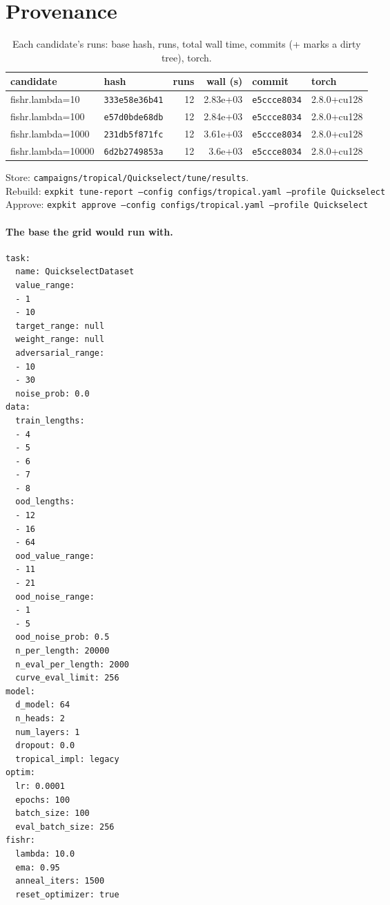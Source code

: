\documentclass[10pt]{article}
\begin{document}
\section{Provenance}
{\small
\begin{longtable}{llrrll}
\caption{Each candidate's runs: base hash, runs, total wall time, commits (+ marks a dirty tree), torch.}\label{tab:provenance}\\
\toprule
candidate & hash & runs & wall (s) & commit & torch\\
\midrule
\endhead
fishr.lambda=10 & \texttt{333e58e36b41} & 12 & 2.83e+03 & \texttt{e5ccce8034} & 2.8.0+cu128\\
fishr.lambda=100 & \texttt{e57d0bde68db} & 12 & 2.84e+03 & \texttt{e5ccce8034} & 2.8.0+cu128\\
fishr.lambda=1000 & \texttt{231db5f871fc} & 12 & 3.61e+03 & \texttt{e5ccce8034} & 2.8.0+cu128\\
fishr.lambda=10000 & \texttt{6d2b2749853a} & 12 & 3.6e+03 & \texttt{e5ccce8034} & 2.8.0+cu128\\
\bottomrule
\end{longtable}
}
\noindent Store: \texttt{campaigns/tropical/Quickselect/tune/results}.\\
Rebuild: \texttt{expkit tune-report --config configs/tropical.yaml --profile Quickselect}\\
Approve: \texttt{expkit approve --config configs/tropical.yaml --profile Quickselect}

\paragraph{The base the grid would run with.}
{\footnotesize
\begin{verbatim}
task:
  name: QuickselectDataset
  value_range:
  - 1
  - 10
  target_range: null
  weight_range: null
  adversarial_range:
  - 10
  - 30
  noise_prob: 0.0
data:
  train_lengths:
  - 4
  - 5
  - 6
  - 7
  - 8
  ood_lengths:
  - 12
  - 16
  - 64
  ood_value_range:
  - 11
  - 21
  ood_noise_range:
  - 1
  - 5
  ood_noise_prob: 0.5
  n_per_length: 20000
  n_eval_per_length: 2000
  curve_eval_limit: 256
model:
  d_model: 64
  n_heads: 2
  num_layers: 1
  dropout: 0.0
  tropical_impl: legacy
optim:
  lr: 0.0001
  epochs: 100
  batch_size: 100
  eval_batch_size: 256
fishr:
  lambda: 10.0
  ema: 0.95
  anneal_iters: 1500
  reset_optimizer: true
\end{verbatim}
}

\clearpage
\appendix
\end{document}
